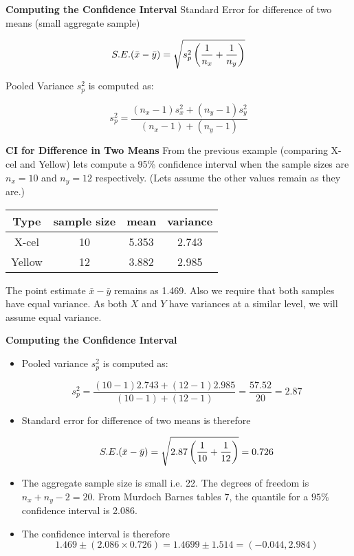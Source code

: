 \documentclass[]{report}
\begin{document}


\noindent \textbf{Computing the Confidence Interval}
Standard Error for difference of two means (small aggregate sample)

\[ S.E.(\bar{x}-\bar{y}) = \sqrt{  s^2_p \left({1\over n_x}+{1\over n_y} \right)} \]

Pooled Variance $s^2_p$ is computed as:

\[ s^2_p = \frac{(n_x-1)s^2_x + (n_y-1)s^2_y}{(n_x-1) + (n_y-1)} \]


\noindent \textbf{CI for Difference in Two Means}
From the previous example (comparing X-cel and Yellow) lets compute a 95\% confidence interval when the sample sizes are $n_x=10$ and $n_y=12$ respectively. (Lets assume the other values remain as they are.)
\begin{center}
	\begin{tabular}{|c|c|c|c|}
		\hline
		Type & sample size & mean & variance \\ \hline
		X-cel & 10 & 5.353 & 2.743 \\ \hline
		Yellow & 12 & 3.882 & 2.985 \\ \hline
	\end{tabular}
\end{center}
The point estimate $\bar{x} - \bar{y}$ remains as 1.469. Also we require that both samples have equal variance. As both $X$ and $Y$ have variances at a similar level, we will assume equal variance.




\noindent \textbf{Computing the Confidence Interval}
\begin{itemize} \item Pooled variance $s^2_p$ is computed as:
	
	\[ s^2_p = \frac{(10-1)2.743 + (12-1)2.985}{(10-1) + (12-1)}  = \frac{57.52}{20} = 2.87\]
	
	\item Standard error for difference of two means is therefore
	
	\[ S.E.(\bar{x}-\bar{y}) = \sqrt{  2.87 \left({1\over 10}+{1\over 12} \right)} = 0.726 \]
	
	\item The aggregate sample size is small i.e. 22. The degrees of freedom is $n_x+n_y-2 = 20$.
	From Murdoch Barnes tables 7, the quantile for a $95\%$ confidence interval is 2.086.
	
	\item The confidence interval is therefore
	\[ 1.469  \pm (2.086 \times 0.726) = 1.4699 \pm 1.514 =  (-0.044, 2.984 )  \]
\end{itemize}
\end{document}
